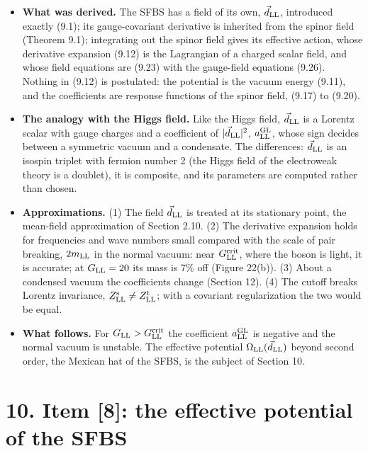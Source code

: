 \documentclass[
  10pt,
]{article}
\providecommand{\tightlist}{%
  \setlength{\itemsep}{0pt}\setlength{\parskip}{0pt}}
\begin{document}
\begin{itemize}
\tightlist
\item
  \textbf{What was derived.} The SFBS has a field of its own,
  \(\vec d_{\rm LL}\), introduced exactly (9.1); its gauge-covariant
  derivative is inherited from the spinor field (Theorem 9.1);
  integrating out the spinor field gives its effective action, whose
  derivative expansion (9.12) is the Lagrangian of a charged scalar
  field, and whose field equations are (9.23) with the gauge-field
  equations (9.26). Nothing in (9.12) is postulated: the potential is
  the vacuum energy (9.11), and the coefficients are response functions
  of the spinor field, (9.17) to (9.20).
\item
  \textbf{The analogy with the Higgs field.} Like the Higgs field,
  \(\vec d_{\rm LL}\) is a Lorentz scalar with gauge charges and a
  coefficient of \(\lvert\vec d_{\rm LL}\rvert^2\),
  \(a^{\rm GL}_{\rm LL}\), whose sign decides between a symmetric vacuum
  and a condensate. The differences: \(\vec d_{\rm LL}\) is an isospin
  triplet with fermion number 2 (the Higgs field of the electroweak
  theory is a doublet), it is composite, and its parameters are computed
  rather than chosen.
\item
  \textbf{Approximations.} (1) The field \(\vec d_{\rm LL}\) is treated
  at its stationary point, the mean-field approximation of Section 2.10.
  (2) The derivative expansion holds for frequencies and wave numbers
  small compared with the scale of pair breaking, \(2m_{\rm LL}\) in the
  normal vacuum: near \(G^{\rm crit}_{\rm LL}\), where the boson is
  light, it is accurate; at \(G_{\rm LL}=20\) its mass is 7\% off
  (Figure 22(b)). (3) About a condensed vacuum the coefficients change
  (Section 12). (4) The cutoff breaks Lorentz invariance,
  \(Z^{\rm s}_{\rm LL}\neq Z^{\rm t}_{\rm LL}\); with a covariant
  regularization the two would be equal.
\item
  \textbf{What follows.} For \(G_{\rm LL}>G^{\rm crit}_{\rm LL}\) the
  coefficient \(a^{\rm GL}_{\rm LL}\) is negative and the normal vacuum
  is unstable. The effective potential
  \(\Omega_{\rm LL}(\vec d_{\rm LL})\) beyond second order, the Mexican
  hat of the SFBS, is the subject of Section 10.
\end{itemize}

\hypertarget{item-8-the-effective-potential-of-the-sfbs}{%
\section{10. Item {[}8{]}: the effective potential of the
SFBS}\label{item-8-the-effective-potential-of-the-sfbs}}
\end{document}
